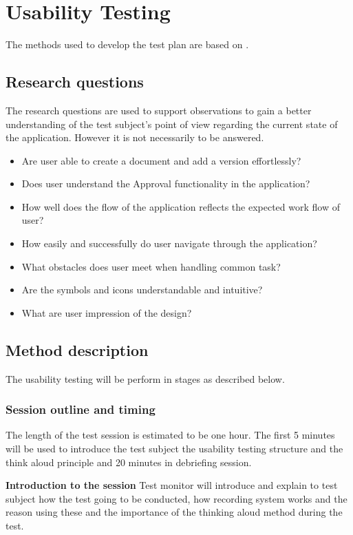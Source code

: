 \chapter{Usability Testing} \label{bilag:utestbilag}
The methods used to develop the test plan are based on \citep[p.~65-91]{HandbookofUsabilityTesting}.

\section{Research questions}
The research questions are used to support observations to gain a better understanding of the test subject's point of view regarding the current state of the application.
However it is not necessarily to be answered.

\begin{itemize}
	\item Are user able to create a document and add a version effortlessly?
	\item Does user understand the Approval functionality in the application?
	\item How well does the flow of the application reflects the expected work flow of user?
	\item How easily and successfully do user navigate through the application?
	\item What obstacles does user meet when handling common task?
	\item Are the symbols and icons understandable and intuitive?
	\item What are user impression of the design?
\end{itemize}

\section{Method description}
The usability testing will be perform in stages as described below.

\subsection{Session outline and timing}
The length of the test session is estimated to be one hour. The first 5 minutes will be used to introduce the test subject the usability testing structure and the think aloud principle and 20 minutes in debriefing session.

\textbf{Introduction to the session}
Test monitor will introduce and explain to test subject how the test going to be conducted, how recording system works and the reason using these and the importance of the thinking aloud method during the test.

